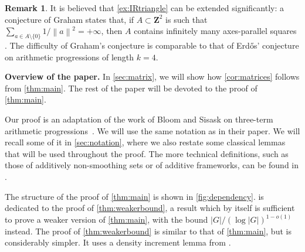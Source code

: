 \documentclass{daj}
\theoremstyle{definition}
\newtheorem{remark}[theorem]{Remark}
\newcommand{\Z}{\ensuremath{\mathbf{Z}}}
\newcommand{\norm}[1]{\left\|#1\right\|}
\begin{document}
\begin{remark}
It is believed that \cref{ex:IRtriangle} can be extended significantly: a conjecture of Graham states that, if $A\subset \Z^2$ is such that $\sum_{a\in A\setminus\{0\}} {1}/{\norm{a}^2} = +\infty$, then $A$ contains infinitely many axes-parallel squares \cite[Conjecture~8.4.6]{Gr}. The difficulty of Graham's conjecture is comparable to that of Erd\H{o}s' conjecture on arithmetic progressions of length $k=4$.
\end{remark}


\textbf{Overview of the paper.} In \cref{sec:matrix}, we will show how \cref{cor:matrices} follows from \cref{thm:main}. The rest of the paper will be devoted to the proof of \cref{thm:main}. 

Our proof is an adaptation of the work of Bloom and Sisask on three-term arithmetic progressions~\cite{BS}. We will use the same notation as in their paper. We will recall some of it in \cref{sec:notation}, where we also restate some classical lemmas that will be used throughout the proof. The more technical definitions, such as those of additively non-smoothing sets or of additive frameworks, can be found in \cite{BS}. %

The structure of the proof of \cref{thm:main} is shown in \cref{fig:dependency}.  is dedicated to the proof of \cref{thm:weakerbound}, a result which by itself is sufficient to prove a weaker version of \cref{thm:main}, with the bound ${|G|}/{(\log |G|)^{1-o(1)}}$ instead. The proof of \cref{thm:weakerbound} is similar to that of \cref{thm:main}, but is considerably simpler. It uses a density increment lemma from \cite{Bloomthesis}. 
\end{document}
